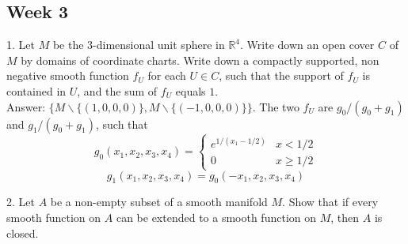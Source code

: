 \documentclass{article}
\theoremstyle{definition}
\begin{document}
\subsection{Week 3}

1. Let $M$ be the 3-dimensional unit sphere in $\mathbb{R}^4$. Write down an open cover $C$ of $M$ by domains of coordinate charts. Write down a compactly supported, non negative smooth function $f_U$ for each $U\in C$, such that the support of $f_U$ is contained in $U$, and the sum of $f_U$ equals $1$.\\

Answer: $\{M\backslash \{(1, 0, 0, 0)\}, M\backslash \{(-1, 0, 0, 0)\}\}$. The two $f_U$ are $g_0/(g_0+g_1)$ and $g_1/(g_0+g_1)$, such that
\[g_0(x_1, x_2, x_3, x_4)=\begin{cases}e^{1/(x_1-1/2)} & x<1/2\\ 0 & x\geq 1/2\end{cases}\]
\[g_1(x_1, x_2, x_3, x_4)=g_0(-x_1, x_2, x_3, x_4)\]

2. Let $A$ be a non-empty subset of a smooth manifold $M$. Show that if every smooth function on $A$ can be extended to a smooth function on $M$, then $A$ is closed.\\
\end{document}

